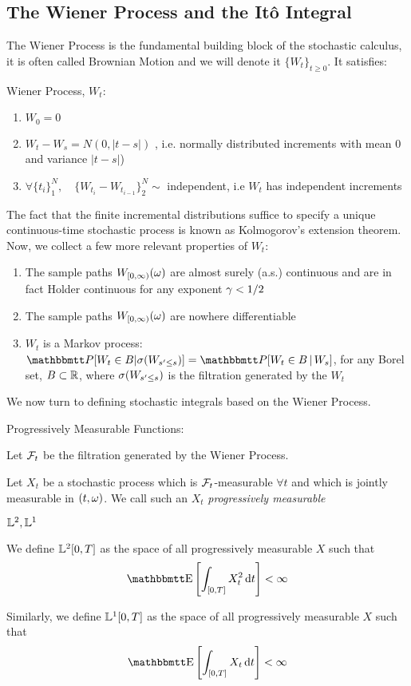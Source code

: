 \subsection{The Wiener Process and the It\^o Integral}
The Wiener Process is the fundamental building block of the stochastic calculus,
it is often called Brownian Motion and we will denote it $\{W_t\}_{t\geq 0}$. It
satisfies:
\begin{defn}Wiener Process, $W_t$:
\begin{enumerate}
  \item $W_0 = 0$
  \item $W_t - W_s = N(0, |t-s|)$ , i.e. normally distributed increments with
  mean 0 and variance $|t-s|$)
  \item $\forall \{t_i\}_1^N, \quad \{W_{t_i} - W_{t_{i-1}} \}_2^N \sim$
  independent, i.e $W_t$ has independent increments
\end{enumerate}
\end{defn}
The fact that the finite incremental distributions suffice to specify a unique
continuous-time stochastic process is known as Kolmogorov's extension theorem.
Now, we collect a few more relevant properties of $W_t$:
\begin{enumerate}
  \item The sample paths $W_{[0,\infty)}({\omega})$
are almost surely (a.s.) continuous and are in fact Holder continuous for any
exponent ${\gamma } < 1/2$
\item The sample paths $W_{[0,\infty)}({\omega})$ are nowhere differentiable
\item $W_t$ is a Markov process: $\Prob[W_t \in B | \s(W_{s' \leq s })] =
\Prob[W_t \in B \,| \,W_s]$, for any Borel set, $B \subset { \mathbb{R} }$, where $\sigma(W_{s'
\leq s })$ is the filtration generated by the $W_t$
\end{enumerate}

We now turn to defining stochastic integrals based on the Wiener Process.
 
\begin{defn} Progressively Measurable Functions:

Let ${\mathcal{F}}_t$ be the filtration generated by the Wiener Process.

Let $X_t$ be a stochastic process which is ${\mathcal{F}}_t$-measurable $\forall t$ and
which is jointly measurable in $(t,{\omega})$. We call such an $X_t$
\emph{progressively measurable}
\end{defn}

\begin{defn} ${\mathbb{L}^2}, {\mathbb{L}^1}$

We define ${\mathbb{L}^2}[0,T]$ as the space of all progressively measurable
$X$ such that
\begin{equation*}
\Exp \left[ \int_{[0,T]} X_t^2 \intd{t} \right] < \infty
\end{equation*}

Similarly, we define ${\mathbb{L}^1}[0,T]$ as the space of all progressively measurable
$X$ such that
\begin{equation*}
\Exp \left[ \int_{[0,T]} X_t \intd{t} \right] < \infty
\end{equation*} 
\end{defn}

